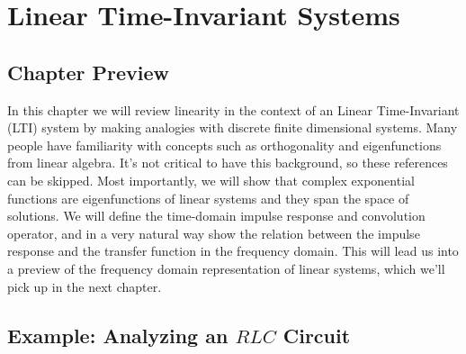 \chapter{Linear Time-Invariant Systems}
\graphicspath{{./figs_LTI/}}
\section{Chapter Preview}
In this chapter we will review linearity in the context of an Linear Time-Invariant (LTI) system by making analogies with discrete finite dimensional systems.  Many people have familiarity with concepts such as orthogonality and eigenfunctions from linear algebra.  It's not critical to have this background, so these references can be skipped.  Most importantly, we will show that complex exponential functions are eigenfunctions of linear systems and they span the space of solutions.  We will define the time-domain impulse response and convolution operator, and in a very natural way show the relation between the impulse response and the transfer function in the frequency domain.  This will lead us into a preview of the frequency domain representation of linear systems, which we'll pick up in the next chapter.
\section{Example:  Analyzing an $RLC$ Circuit}
